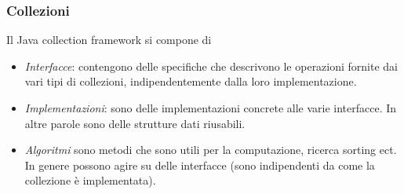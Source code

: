 \documentclass{beamer}
\begin{document}
\begin{frame}[fragile]
\frametitle{Collezioni}
 Il Java collection framework si compone di 
\begin{itemize}
\item \emph{Interfacce}: contengono delle specifiche che descrivono le operazioni fornite dai vari tipi di collezioni, indipendentemente dalla loro implementazione. 
\item \emph{Implementazioni}: sono delle implementazioni concrete alle varie interfacce. In altre parole sono delle strutture dati riusabili.
\item \emph{Algoritmi} sono metodi che sono utili per la computazione, ricerca sorting ect. In genere possono agire su delle interfacce (sono indipendenti da come la collezione \`e implementata). 
\end{itemize}
\end{frame}
\end{document}
